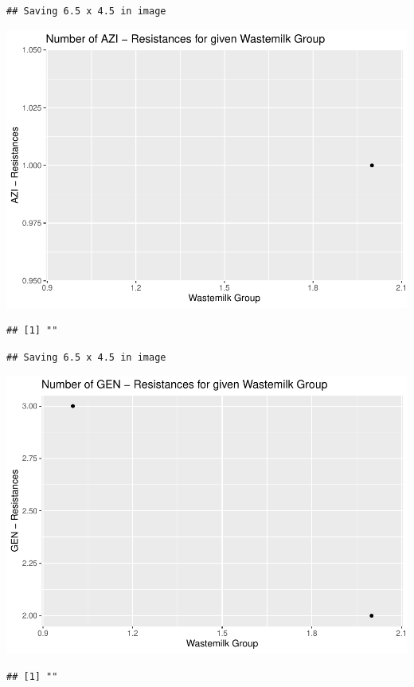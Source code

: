 \documentclass[
]{article}
\begin{document}
\begin{verbatim}
## Saving 6.5 x 4.5 in image
\end{verbatim}

\includegraphics{NResistenzen_files/figure-latex/binary_or_nominal_variables-3.pdf}

\begin{verbatim}
## [1] ""
\end{verbatim}

\begin{verbatim}
## Saving 6.5 x 4.5 in image
\end{verbatim}

\includegraphics{NResistenzen_files/figure-latex/binary_or_nominal_variables-4.pdf}

\begin{verbatim}
## [1] ""
\end{verbatim}
\end{document}
